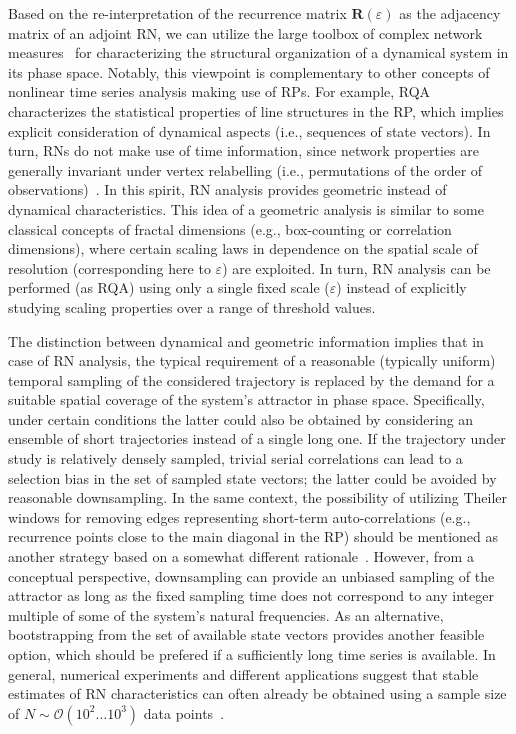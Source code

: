 \documentclass[graybox]{svmult}
\begin{document}
Based on the re-interpretation of the recurrence matrix $\mathbf{R}(\varepsilon)$ as the adjacency matrix of an adjoint RN, we can utilize the large toolbox of complex network measures~\cite{Albert2002,Boccaletti2006,Costa2007,Newman2003} for characterizing the structural organization of a dynamical system in its phase space. Notably, this viewpoint is complementary to other concepts of nonlinear time series analysis making use of RPs. For example, RQA characterizes the statistical properties of line structures in the RP, which implies explicit consideration of dynamical aspects (i.e., sequences of state vectors). In turn, RNs do not make use of time information, since network properties are generally invariant under vertex relabelling (i.e., permutations of the order of observations)~\cite{Donner2010NJP}. In this spirit, RN analysis provides geometric instead of dynamical characteristics. This idea of a geometric analysis is similar to some classical concepts of fractal dimensions (e.g., box-counting or correlation dimensions), where certain scaling laws in dependence on the spatial scale of resolution (corresponding here to $\varepsilon$) are exploited. In turn, RN analysis can be performed (as RQA) using only a single fixed scale ($\varepsilon$) instead of explicitly studying scaling properties over a range of threshold values.

The distinction between dynamical and geometric information implies that in case of RN analysis, the typical requirement of a reasonable (typically uniform) temporal sampling of the considered trajectory is replaced by the demand for a suitable spatial coverage of the system's attractor in phase space. Specifically, under certain conditions the latter could also be obtained by considering an ensemble of short trajectories instead of a single long one. If the trajectory under study is relatively densely sampled, trivial serial correlations can lead to a selection bias in the set of sampled state vectors; the latter could be avoided by reasonable downsampling. In the same context, the possibility of utilizing Theiler windows for removing edges representing short-term auto-correlations (e.g., recurrence points close to the main diagonal in the RP) should be mentioned as another strategy based on a somewhat different rationale~\cite{Donner2010NJP}. However, from a conceptual perspective, downsampling can provide an unbiased sampling of the attractor as long as the fixed sampling time does not correspond to any integer multiple of some of the system's natural frequencies. As an alternative, bootstrapping from the set of available state vectors provides another feasible option, which should be prefered if a sufficiently long time series is available. In general, numerical experiments and different applications suggest that stable estimates of RN characteristics can often already be obtained using a sample size of $N\sim\mathcal{O}(10^2\dots 10^3)$ data points~\cite{Donges2011NPG,Donges2011PNAS}.
\end{document}
